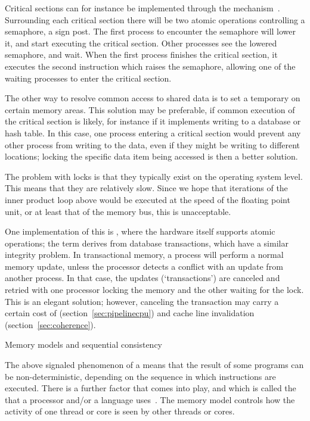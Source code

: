 Critical sections can for instance be implemented through the 
mechanism~\cite{Dijkstra:semaphores}. Surrounding each critical
section there will be two atomic operations controlling a semaphore, a
sign post.
The first process to encounter the semaphore will lower it, and start
executing the critical section. Other processes see the lowered
semaphore, and wait. When the first process finishes the critical
section, it executes the second instruction which raises the
semaphore, allowing one of the waiting processes to enter the critical
section.

The other way to resolve common access to shared data is to set a 
temporary  on certain memory areas. This solution may
be preferable, if common execution of the critical section is likely,
for instance if it implements writing to a database or hash table. In
this case, one process entering a
critical section would prevent any other process from writing
to the data, even if they might be writing to different locations;
locking the specific data item being accessed is then a better
solution.

The problem with locks is that they typically exist on the operating
system level. This means that they are relatively slow. Since we hope that
iterations of the inner product loop above would be executed at the
speed of the floating point unit, or at least that of the memory bus,
this is unacceptable.

One implementation of
this is , where the hardware itself
supports atomic operations; the term derives from database
transactions, which have a similar integrity problem. In transactional
memory, a process will perform a normal memory update, unless the
processor detects a conflict with an update from another process. In
that case, the updates (`transactions') are canceled and retried with
one processor locking the memory and the other waiting for the
lock. This is an elegant solution; however, canceling the transaction
may carry a certain cost of 
(section~\ref{sec:pipelinecpu}) and
cache line invalidation (section~\ref{sec:coherence}).


 {Memory models and sequential consistency}
\label{sec:seq-consist}

The above signaled phenomenon of a 
means that the result of some programs can be non-deterministic,
depending on the sequence in which instructions are executed.
There is a further factor that comes into play, and which is
called the  that a processor and/or a
language uses~\cite{AdveBoehm:memorymodels}.
The memory model controls how the activity of one thread or core
is seen by other threads or cores.

